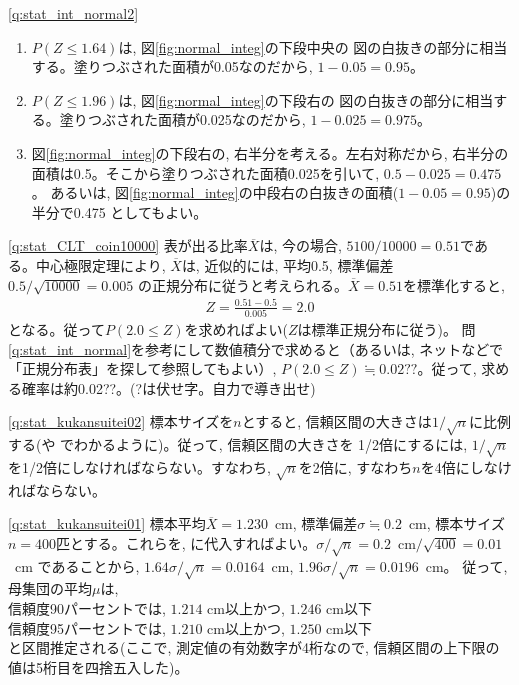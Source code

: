 \ref{q:stat_int_normal2} 　
\begin{enumerate}
\item $P(Z \leq 1.64)$は, 図\ref{fig:normal_integ}の下段中央の
図の白抜きの部分に相当する。塗りつぶされた面積が0.05なのだから, $1-0.05=0.95$。
\item $P(Z \leq 1.96)$は, 図\ref{fig:normal_integ}の下段右の
図の白抜きの部分に相当する。塗りつぶされた面積が0.025なのだから, $1-0.025=0.975$。
\item 図\ref{fig:normal_integ}の下段右の, 右半分を考える。左右対称だから, 
右半分の面積は0.5。そこから塗りつぶされた面積0.025を引いて, $0.5-0.025=0.475$。
あるいは, 図\ref{fig:normal_integ}の中段右の白抜きの面積($1-0.05=0.95$)の半分で0.475
としてもよい。
\end{enumerate}


\ref{q:stat_CLT_coin10000}  表が出る比率$\overline{X}$は, 
今の場合, $5100/10000=0.51$である。中心極限定理により, 
$\overline{X}$は, 近似的には, 平均0.5, 標準偏差$0.5/\sqrt{10000}=0.005$
の正規分布に従うと考えられる。$\overline{X}=0.51$を標準化すると, 
\begin{eqnarray*}Z=\frac{0.51-0.5}{0.005}=2.0\end{eqnarray*}
となる。従って$P(2.0\leq Z)$を求めればよい($Z$は標準正規分布に従う)。
問\ref{q:stat_int_normal}を参考にして数値積分で求めると（あるいは, ネットなどで「正規分布表」を探して参照してもよい）, 
$P(2.0\leq Z)\fallingdotseq 0.02??$。従って, 求める確率は約0.02??。(?は伏せ字。自力で導き出せ)
\mv

\ref{q:stat_kukansuitei02} 標本サイズを$n$とすると, 
信頼区間の大きさは$1/\sqrt{n}$に比例する(や
でわかるように)。従って, 信頼区間の大きさを
1/2倍にするには, $1/\sqrt{n}$を1/2倍にしなければならない。すなわち, 
$\sqrt{n}$を2倍に, すなわち$n$を4倍にしなければならない。
\mv

\ref{q:stat_kukansuitei01}
標本平均$\overline{X}=1.230$~cm, 標準偏差$\sigma\fallingdotseq 0.2$~cm, 
標本サイズ$n=400$匹とする。これらを, 
に代入すればよい。$\sigma/\sqrt{n}=0.2$~cm$/\sqrt{400}=0.01$~cm
であることから, $1.64\sigma/\sqrt{n}=0.0164$~cm, $1.96\sigma/\sqrt{n}=0.0196$~cm。
従って, 母集団の平均$\mu$は, \\
信頼度90パーセントでは, $1.214\text{~cm}$以上かつ, $1.246\text{~cm}$以下\\
信頼度95パーセントでは, $1.210\text{~cm}$以上かつ, $1.250\text{~cm}$以下\\
と区間推定される(ここで, 測定値の有効数字が4桁なので, 信頼区間の上下限の値は5桁目を四捨五入した)。

